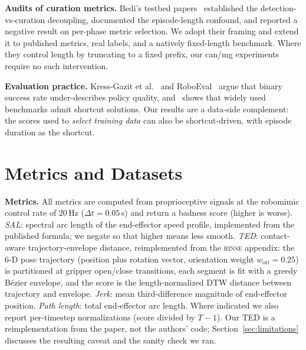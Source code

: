 \documentclass{article}
\newcommand{\rinse}{\textsc{rinse}}
\begin{document}
\textbf{Audits of curation metrics.} Bedi's testbed
papers~\citep{bedi-audit,bedi-policy,bedi-phase} established the
detection-vs-curation decoupling, documented the episode-length confound, and
reported a negative result on per-phase metric selection. We adopt their
framing and extend it to published metrics, real labels, and a natively
fixed-length benchmark. Where they control length by truncating to a fixed
prefix, our can/mg experiments require no such intervention.

\textbf{Evaluation practice.} Kress-Gazit et
al.~\citep{empirical-science} and RoboEval~\citep{roboeval} argue that binary
success rate under-describes policy quality, and~\citep{benchmarking-audit}
shows that widely used benchmarks admit shortcut solutions. Our results are a
data-side complement: the scores used to \emph{select training data} can also
be shortcut-driven, with episode duration as the shortcut.

\section{Metrics and Datasets}
\label{sec:setup}

\textbf{Metrics.} All metrics are computed from proprioceptive signals at the
robomimic control rate of 20\,Hz ($\Delta t = 0.05$\,s) and return a badness
score (higher is worse). \emph{SAL}: spectral arc length of the end-effector
speed profile, implemented from the published formula; we negate so that
higher means less smooth. \emph{TED}: contact-aware trajectory-envelope
distance, reimplemented from the \rinse{} appendix: the 6-D pose trajectory
(position plus rotation vector, orientation weight $w_{\mathrm{ori}} =
0.25$) is partitioned at gripper open/close transitions, each segment is fit
with a greedy B\'ezier envelope, and the score is the length-normalized DTW
distance between trajectory and envelope. \emph{Jerk}: mean third-difference
magnitude of end-effector position. \emph{Path length}: total end-effector
arc length. Where indicated we also report per-timestep normalizations
(score divided by $T{-}1$). Our TED is a reimplementation from the paper, not
the authors' code; Section~\ref{sec:limitations} discusses the resulting
caveat and the sanity check we ran.
\end{document}
